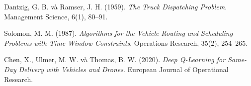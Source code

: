 \documentclass[13pt, a4paper]{extarticle} %
\begin{document}
\newpage
\begin{thebibliography}{}

Dantzig, G. B. và Ramser, J. H. (1959). \textit{The Truck Dispatching Problem}. Management Science, 6(1), 80--91.

Solomon, M. M. (1987). \textit{Algorithms for the Vehicle Routing and Scheduling Problems with Time Window Constraints}. Operations Research, 35(2), 254--265.

Chen, X., Ulmer, M. W. và Thomas, B. W. (2020). \textit{Deep Q-Learning for Same-Day Delivery with Vehicles and Drones}. European Journal of Operational Research.

\end{thebibliography}
\end{document}
